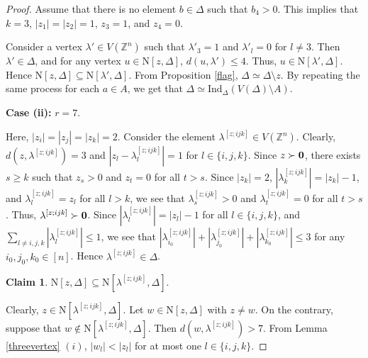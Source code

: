 \documentclass{amsart}
\theoremstyle{definition}
\newtheorem{claim}[theorem]{Claim}
\theoremstyle{remark}
\numberwithin{equation}{section}
\newcommand{\D}{\Delta}
\def\Z{{\mathbb{Z}}}
\def\n{{\mathrm{N}}}
\begin{document}
\begin{proof}
	Assume that there is no element $b\in \D$ such that $b_4>0$. This implies that $k=3$, $|z_1|=|z_2|=1$, $z_3=1$, and $z_4=0$.
	
	
	Consider a vertex $\lambda' \in V(\Z^n)$ such that $\lambda'_3 = 1$ and $\lambda'_l=0$ for $l\neq 3$. Then $\lambda'\in \D$, and 
	for any vertex $u\in\n[z,\D]$, $d(u,\lambda')\leq 4$. Thus, $u\in \n[\lambda',\D]$. Hence $\n[z,\D]\subseteq \n[\lambda',\D]$. From Proposition \ref{flag}, $\D\simeq \D\setminus z$. By repeating the same process for each $a\in A$, we get that $\D\simeq \mathrm{Ind}_{\D}(V(\D)\setminus A)$. 
	
	
	
	\noindent\textbf{Case (ii):} $r = 7$.
	
	\noindent Here, $|z_i| = |z_j| = |z_k| = 2$.
	Consider the element  $\lambda^{[z;ijk]}\in V(\Z^n)$. Clearly,  $d(z,\lambda^{[z;ijk]})=3$ and  $|z_l-\lambda^{[z;ijk]}_l|=1$ for $l\in \{i,j,k\}$.
	Since $z\succ {\bf{0}}$, there exists $s\geq k$ such that $z_{s}>0$ and $z_{t}=0$ for all $t > s$. Since $|z_k|=2$, $|\lambda^{[z;ijk]}_k|=|z_k|-1$, and $\lambda^{[z;ijk]}_l=z_l$ for all $l>k$, we see that $\lambda^{[z;ijk]}_{s}>0$ and $\lambda^{[z;ijk]}_{t}=0$ for all $t > s$. Thus, $\lambda^{[z;ijk]}\succ {\bf{0}}$. Since $|\lambda^{[z;ijk]}_l|= |z_l|-1$ for all $l\in \{i,j,k\}$, and $\sum_{l\neq i,j,k}|\lambda^{[z;ijk]}_l|\leq 1$, we see that $|\lambda^{[z;ijk]}_{i_0}|+|\lambda^{[z;ijk]}_{j_0}|+|\lambda^{[z;ijk]}_{k_0}|\leq 3$ for any $i_0,j_0,k_0\in [n]$. Hence $\lambda^{[z;ijk]} \in \D$.
	
	\begin{claim}\label{claim1}
		$\n[z,\D] \subseteq  \n[\lambda^{[z;ijk]},\D]$.
	\end{claim}
	
	 Clearly, $z\in \n[\lambda^{[z;ijk]},\D]$. Let $w\in \n[z,\D]$ with $z\neq w$. 
	On the contrary, suppose that $w\notin \n[\lambda^{[z;ijk]}, \D]$. Then  $d(w, \lambda^{[z;ijk]}) > 7$.  From Lemma \ref{threevertex} $(i)$, $|w_l| < |z_l|$ for at most one $l \in \{i, j, k\}$.
	

\end{proof}
\end{document}
